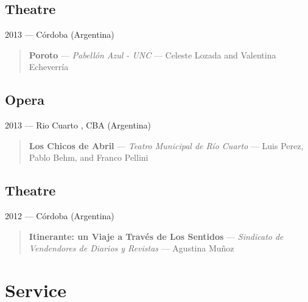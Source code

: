 \documentclass[12pt,overlapped]{res}%
\begin{document}
\begin{resume}
\subsection{Theatre}%
2013 --- Córdoba (Argentina)%
\begin{quote}
\textbf{Poroto} --- \textit{Pabellón Azul {-} UNC } --- Celeste Lozada and Valentina Echeverría
\end{quote}%
%
%
%
\subsection{Opera}%
2013 --- Rio Cuarto , CBA (Argentina)%
\begin{quote}
\textbf{Los Chicos de Abril} --- \textit{Teatro Municipal de Río Cuarto} --- Luis Perez, Pablo Behm, and Franco Pellini
\end{quote}%
%
%
%
\subsection{Theatre}%
2012 --- Córdoba (Argentina)%
\begin{quote}
\textbf{Itinerante: un Viaje a Través de Los Sentidos} --- \textit{Sindicato de Vendendores de Diarios y Revistas} --- Agustina Muñoz
\end{quote}%
\section{Service}%
%
%
%

\end{resume}
\end{document}

